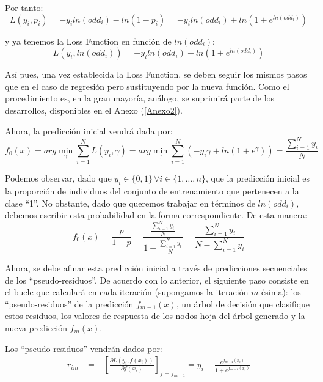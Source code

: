 \documentclass[12pt,twoside]{article}
\begin{document}
Por tanto:
\begin{equation*}
L(y_i, p_i) = -y_i ln(odd_i) - ln(1-p_i) = -y_i ln(odd_i) + ln \left( 1 + e^{ln(odd_i)} \right)
\end{equation*}

\noindent
y ya tenemos la Loss Function en función de $ln(odd_i)$:
\begin{equation*}
L(y_i, ln(odd_i)) = -y_i ln(odd_i) + ln \left( 1 + e^{ln(odd_i)} \right)
\end{equation*}

Así pues, una vez establecida la Loss Function, se deben seguir los mismos pasos que en el caso de regresión pero sustituyendo por la nueva función. Como el procedimiento es, en la gran mayoría, análogo, se suprimirá parte de los desarrollos, disponibles en el Anexo (\ref{Anexo2}). 

Ahora, la predicción inicial vendrá dada por:
\begin{equation}
\label{eqn:1}
f_0(x) = arg\min_{\gamma} \sum_{i=1}^N L(y_i, \gamma) = arg\min_{\gamma} \sum_{i=1}^N \left( -y_i \gamma + ln \left( 1 + e^{\gamma} \right) \right) = \frac{\sum_{i=1}^{N} y_i}{N} 
\end{equation}

Podemos observar, dado que $y_i \in \{0, 1 \} \, \forall i \in \{1, \dots, n \}$, que la predicción inicial es la proporción de individuos del conjunto de entrenamiento que pertenecen a la clase ``1''. No obstante, dado que queremos trabajar en términos de $ln(odd_i)$, debemos escribir esta probabilidad en la forma correspondiente. De esta manera:
\begin{equation*}
f_0(x) = \frac{p}{1-p} = \frac{\frac{\sum_{i=1}^{N} y_i}{N}}{1 - \frac{\sum_{i=1}^{N} y_i}{N}} = \frac{\sum_{i=1}^{N} y_i}{N -\sum_{i=1}^{N} y_i}
\end{equation*}

Ahora, se debe afinar esta predicción inicial a través de predicciones secuenciales de los ``pseudo-residuos''. De acuerdo con lo anterior, el siguiente paso consiste en el bucle que calculará en cada iteración (supongamos la iteración $m$-ésima): los ``pseudo-residuos'' de la predicción $f_{m-1}(x)$, un árbol de decisión que clasifique estos residuos, los valores de respuesta de los nodos hoja del árbol generado y la nueva predicción $f_m(x)$.

Los ``pseudo-residuos'' vendrán dados por:
\begin{equation}
\label{eqn:2}
\begin{split}
r_{im} &= -\left[ \frac{\partial L(y_i, f(x_i))}{\partial f(x_i)} \right]_{f=f_{m-1}} =  y_i - \frac{e^{f_{m-1}(x_i)}}{1 + e^{f_{m-1}(x_i)}}
\end{split}
\end{equation}
\end{document}
